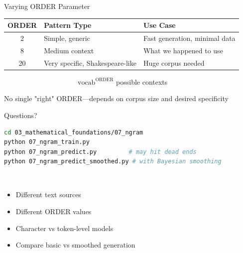\documentclass[aspectratio=169]{beamer}
\renewcommand{\textbf}[1]{\textcolor{white}{\bfseries #1}}
\begin{document}
\begin{frame}{Varying ORDER Parameter}
\begin{tabular}{|c|l|l|}
\hline
\rowcolor{codebg}
ORDER & Pattern Type & Use Case \\
\hline
2 & Simple, generic & Fast generation, minimal data \\
8 & Medium context & What we happened to use \\
20 & Very specific, Shakespeare-like & Huge corpus needed \\
\hline
\end{tabular}

\vspace{1em}
\textbf{Exponential growth:} $\text{vocab}^{\text{ORDER}}$ possible contexts

\vspace{0.5em}
{\small No single "right" ORDER—depends on corpus size and desired specificity}
\end{frame}

\begin{frame}[fragile]{Questions?}
\textbf{Try it yourself:}
\begin{lstlisting}[language=bash]
cd 03_mathematical_foundations/07_ngram
python 07_ngram_train.py
python 07_ngram_predict.py         # may hit dead ends
python 07_ngram_predict_smoothed.py # with Bayesian smoothing
\end{lstlisting}

\vspace{1em}
\textbf{Experiment with:}
\begin{itemize}
    \item Different text sources
    \item Different ORDER values
    \item Character vs token-level models
    \item Compare basic vs smoothed generation
\end{itemize}
\end{frame}
\end{document}
